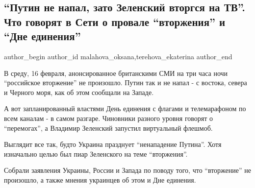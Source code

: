  
 
 
 
 
 
\subsection{\enquote{Путин не напал, зато Зеленский вторгся на ТВ}. Что говорят в Сети о провале \enquote{вторжения} и \enquote{Дне единения}}
\label{sec:16_02_2022.stz.news.ua.strana.4.putin_ne_napal}
 
\ifcmt
 author_begin
   author_id malahova_oksana,terehova_ekaterina
 author_end
\fi

В среду, 16 февраля, анонсированное британскими СМИ на три часа ночи
\enquote{российское вторжение} не произошло. Путин так и не напал - с востока, севера и
Черного моря, как об этом сообщали на Западе.


А вот запланированный властями День единения с флагами и телемарафоном по всем
каналам - в самом разгаре. Чиновники разного уровня говорят о \enquote{перемогах}, а
Владимир Зеленский запустил виртуальный флешмоб.

Выглядит все так, будто Украина празднует \enquote{ненападение Путина}. Хотя изначально
целью был пиар Зеленского на теме \enquote{вторжения}.

Собрали заявления Украины, России и Запада по поводу того, что \enquote{вторжение} не
произошло, а также мнения украинцев об этом и Дне единения.




